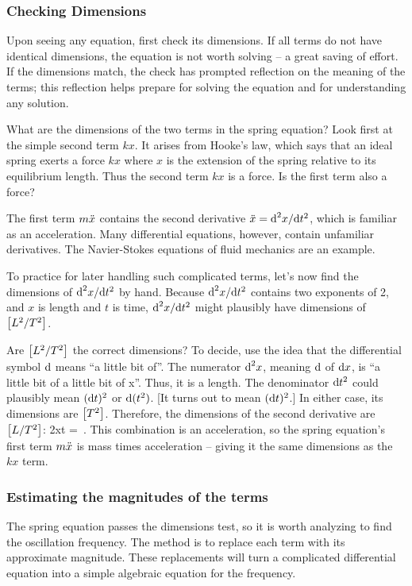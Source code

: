 \subsubsection{Checking Dimensions}
Upon seeing any equation, first check its dimensions. If all terms do not have identical dimensions, the equation is not worth solving -- a great saving of effort. If the dimensions match, the check has prompted reflection on the meaning of the terms; this reflection helps prepare for solving the equation and for understanding any solution.

What are the dimensions of the two terms in the spring equation? Look first at the simple second term $kx$. It arises from Hooke's law, which says that an ideal spring exerts a force $kx$ where $x$ is the extension of the spring relative to its equilibrium length. Thus the second term $kx$ is a force. Is the first term also a force?

The first term $m\ddot{x}$ contains the second derivative $\ddot{x} = \text{d}^2 x/\text{d} t^2$, which is familiar as an acceleration. Many differential equations, however, contain unfamiliar derivatives. The Navier-Stokes equations of fluid mechanics are an example.

To practice for later handling such complicated terms, let's now find the dimensions of $\text{d}^2 x/\text{d} t^2$ by hand. Because $\text{d}^2 x/\text{d} t^2$ contains two exponents of 2, and $x$ is length and $t$ is time, $\text{d}^2 x/\text{d} t^2$ might plausibly have dimensions of $\left[{L^2/T^2}\right]$.

Are $\left[{L^2/T^2}\right]$ the correct dimensions? To decide, use the idea that the differential symbol $\text{d}{}$ means ``a little bit of''. The numerator $\text{d}^2 x$, meaning $\text{d}{}$ of $\text{d} x$, is ``a little bit of a little bit of x''. Thus, it is a length. The denominator $\text{d} t^2$ could plausibly mean $(\text{d} t)^2$ or $\text{d}(t^2)$. [It turns out to mean $(\text{d} t)^2$.] In either case, its dimensions are $\left[{T^2}\right]$. Therefore, the dimensions of the second derivative are $\left[{L/T^2}\right]$:
\beq
\dim\nxod 2xt = \,.
\eeq
This combination is an acceleration, so the spring equation's first term $m\ddot{x}$ is mass times acceleration -- giving it the same dimensions as the $kx$ term.


\subsubsection{Estimating the magnitudes of the terms}
The spring equation passes the dimensions test, so it is worth analyzing to find the oscillation frequency. The method is to replace each term with its approximate magnitude. These replacements will turn a complicated differential equation into a simple algebraic equation for the frequency.

